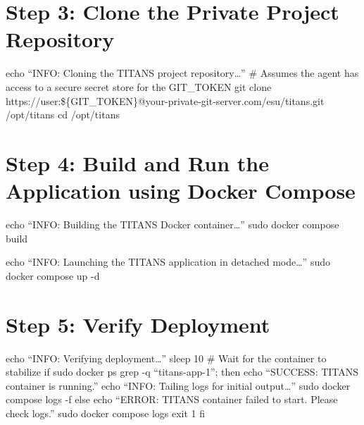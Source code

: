 \documentclass[letterpaper,twocolumn]{article}
\begin{document}
\hypertarget{step-3-clone-the-private-project-repository}{%
\section{Step 3: Clone the Private Project
Repository}\label{step-3-clone-the-private-project-repository}}

echo ``INFO: Cloning the TITANS project repository\ldots{}'' \# Assumes
the agent has access to a secure secret store for the GIT\_TOKEN git
clone
https://user:\$\{GIT\_TOKEN\}@your-private-git-server.com/esu/titans.git
/opt/titans cd /opt/titans

\hypertarget{step-4-build-and-run-the-application-using-docker-compose}{%
\section{Step 4: Build and Run the Application using Docker
Compose}\label{step-4-build-and-run-the-application-using-docker-compose}}

echo ``INFO: Building the TITANS Docker container\ldots{}'' sudo docker
compose build

echo ``INFO: Launching the TITANS application in detached mode\ldots{}''
sudo docker compose up -d

\hypertarget{step-5-verify-deployment}{%
\section{Step 5: Verify Deployment}\label{step-5-verify-deployment}}

echo ``INFO: Verifying deployment\ldots{}'' sleep 10 \# Wait for the
container to stabilize if sudo docker ps \textbar{} grep -q
``titans-app-1''; then echo ``SUCCESS: TITANS container is running.''
echo ``INFO: Tailing logs for initial output\ldots{}'' sudo docker
compose logs -f else echo ``ERROR: TITANS container failed to start.
Please check logs.'' sudo docker compose logs exit 1 fi
\end{document}
